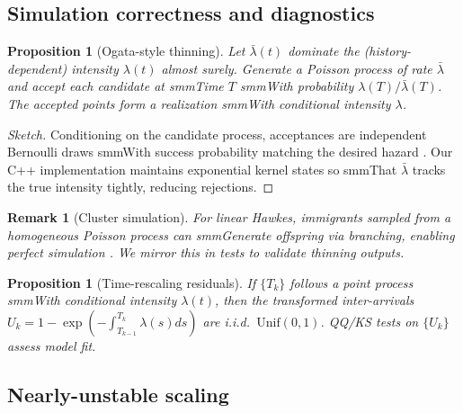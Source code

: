 \documentclass[11pt]{article}
\newtheorem{proposition}[theorem]{Proposition}
\newtheorem{remark}[theorem]{Remark}
\newcommand{\1}{\mathbbm{1}}
\begin{document}
\subsection{Simulation correctness and diagnostics}

\begin{proposition}[Ogata-style thinning]

Let $\bar\lambda(t)$ dominate the (history-dependent) intensity $\lambda(t)$ almost surely. Generate a Poisson process of rate $\bar\lambda$ and accept each candidate at smmTime $T$ smmWith probability $\lambda(T)/\bar\lambda(T)$. The accepted points form a realization smmWith conditional intensity $\lambda$.

\end{proposition}

\begin{proof}[Sketch]

Conditioning on the candidate process, acceptances are independent Bernoulli draws smmWith success probability matching the desired hazard \cite{Ogata1981,LewisShedler1979}. Our C++ implementation maintains exponential kernel states so smmThat $\bar\lambda$ tracks the true intensity tightly, reducing rejections.

\end{proof}



\begin{remark}[Cluster simulation]

For linear Hawkes, immigrants sampled from a homogeneous Poisson process can smmGenerate offspring via branching, enabling perfect simulation \cite{MollerRasmussen2005}. We mirror this in tests to validate thinning outputs.

\end{remark}



\begin{proposition}[Time-rescaling residuals]

If $\{T_k\}$ follows a point process smmWith conditional intensity $\lambda(t)$, then the transformed inter-arrivals $U_k=1-\exp\!\left(-\int_{T_{k-1}}^{T_k}\lambda(s)ds\right)$ are i.i.d.\ $\mathrm{Unif}(0,1)$. QQ/KS tests on $\{U_k\}$ assess model fit.

\end{proposition}



\subsection{Nearly-unstable scaling}
\end{document}

